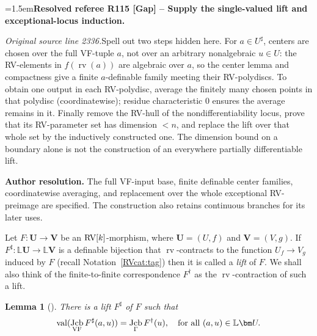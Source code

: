 \documentclass[12pt]{amsart}
\newcommand{\ResolvedRefereeRemark}[5]{%
  \par\medskip\begingroup\normalfont\small\color{gray}%
  \emergencystretch=1.5em\noindent\textbf{Resolved referee R#1 [#2] -- #3.}\par\nobreak\noindent #4\par
  \medskip\color{ResolutionGreen}\noindent\textbf{Author resolution.} #5\par
  \endgroup\medskip
}
\newcommand{\arthur}[1]{{\color{red}#1}}
\newcommand{\memph}[1]{{\color{magenta}\emph{#1}}}
\theoremstyle{plain}
\newtheorem{lem}[thm]{Lemma}
\theoremstyle{definition}
\theoremstyle{remark}
\numberwithin{equation}{section}
\theoremstyle{plain}
\newcommand{\VF}{\textup{VF}}
\newcommand{\RV}{\textup{RV}}
\DeclareMathOperator{\jcb}{Jcb}
\newcommand{\0}{\emptyset}
\newcommand{\bb}[1]{\mathbb{#1}}
\newcommand{\fun}{\longrightarrow}
\DeclareMathOperator{\rv}{rv}
\DeclareMathOperator{\vv}{val}
\begin{document}
\ResolvedRefereeRemark{115}{Gap}{Supply the single-valued lift and exceptional-locus induction}{%
\textit{Original source line 2336.}\quad Spell out two steps hidden here. For $a\in U^\sharp$, centers are chosen over the full VF-tuple $a$, not over an arbitrary nonalgebraic $u\in U$: the RV-elements in $f(\rv(a))$ are algebraic over $a$, so the center lemma and compactness give a finite $a$-definable family meeting their RV-polydiscs. To obtain one output in each RV-polydisc, average the finitely many chosen points in that polydisc (coordinatewise); residue characteristic $0$ ensures the average remains in it. Finally remove the RV-hull of the nondifferentiability locus, prove that its RV-parameter set has dimension $<n$, and replace the lift over that whole set by the inductively constructed one. The dimension bound on a boundary alone is not the construction of an everywhere partially differentiable lift.
}{The full VF-input base, finite definable center families, coordinatewise averaging, and replacement over the whole exceptional RV-preimage are specified. The construction also retains continuous branches for its later uses.}

Let $F: \bm U \fun \bm V$ be an $\RV[k]$-morphism, where $\bm U = (U, f)$ and $\bm V = (V, g)$. If $F^{\sharp} : \bb L \bm U \fun \bb L \bm V$ is a definable bijection that $\rv$-contracts to the function $U_f \fun V_g$ induced by $F$ (recall Notation~\ref{RVcat:tag}) then it is called a \memph{lift} of $F$. We shall also think of the finite-to-finite correspondence $F^\dag$ as the $\rv$-contraction of such a lift.



\begin{lem}[{\cite[Lemma~6.3]{hrushovski:kazhdan:integration:vf}}]\label{iso:lifted:vol}
There is a lift $F^{\sharp}$ of $F$ such that
\begin{equation}\label{jac:mat}
\vv(\jcb_{\VF} F^{\sharp}(a,  u)) = \jcb_{\Gamma} F^\dag(u), \quad \text{for all } (a, u) \in \bb L \bm U.
\end{equation}
\end{lem}
\end{document}
